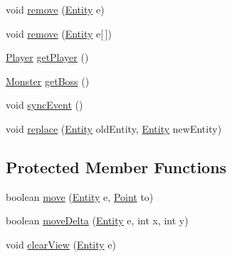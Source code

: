 \begin{DoxyCompactItemize}
\item 
void \hyperlink{classjdungeon_1_1core_1_1world_1_1_world_abadb5be57a1d6e6633a802d69420e931}{remove} (\hyperlink{classjdungeon_1_1core_1_1world_1_1_entity}{Entity} e)
\item 
void \hyperlink{classjdungeon_1_1core_1_1world_1_1_world_a304affa3d8a60755d18f840bbcd049d6}{remove} (\hyperlink{classjdungeon_1_1core_1_1world_1_1_entity}{Entity} e\mbox{[}$\,$\mbox{]})
\item 
\hyperlink{classjdungeon_1_1core_1_1world_1_1_player}{Player} \hyperlink{classjdungeon_1_1core_1_1world_1_1_world_a104fb8d3ad3b13724c6ad3da0a0ee549}{getPlayer} ()
\item 
\hyperlink{classjdungeon_1_1core_1_1world_1_1creatures_1_1_monster}{Monster} \hyperlink{classjdungeon_1_1core_1_1world_1_1_world_a31524ff278ad7663579476d66f777f04}{getBoss} ()
\item 
void \hyperlink{classjdungeon_1_1core_1_1world_1_1_world_a9ef8adc1ff22ccd025db1380dce3c308}{syncEvent} ()
\item 
void \hyperlink{classjdungeon_1_1core_1_1world_1_1_world_a2b0f5b8dfecc62c20ab3be6df0643da9}{replace} (\hyperlink{classjdungeon_1_1core_1_1world_1_1_entity}{Entity} oldEntity, \hyperlink{classjdungeon_1_1core_1_1world_1_1_entity}{Entity} newEntity)
\end{DoxyCompactItemize}
\subsection*{Protected Member Functions}
\begin{DoxyCompactItemize}
\item 
boolean \hyperlink{classjdungeon_1_1core_1_1world_1_1_world_a4d6e096b179297412c7fef75d0342947}{move} (\hyperlink{classjdungeon_1_1core_1_1world_1_1_entity}{Entity} e, \hyperlink{classjdungeon_1_1core_1_1world_1_1_point}{Point} to)
\item 
boolean \hyperlink{classjdungeon_1_1core_1_1world_1_1_world_a9f93075e1e06302a569264709816619d}{moveDelta} (\hyperlink{classjdungeon_1_1core_1_1world_1_1_entity}{Entity} e, int x, int y)
\item 
void \hyperlink{classjdungeon_1_1core_1_1world_1_1_world_a03c55437171cf7d0e77110c94470ed1e}{clearView} (\hyperlink{classjdungeon_1_1core_1_1world_1_1_entity}{Entity} e)
\end{DoxyCompactItemize}
